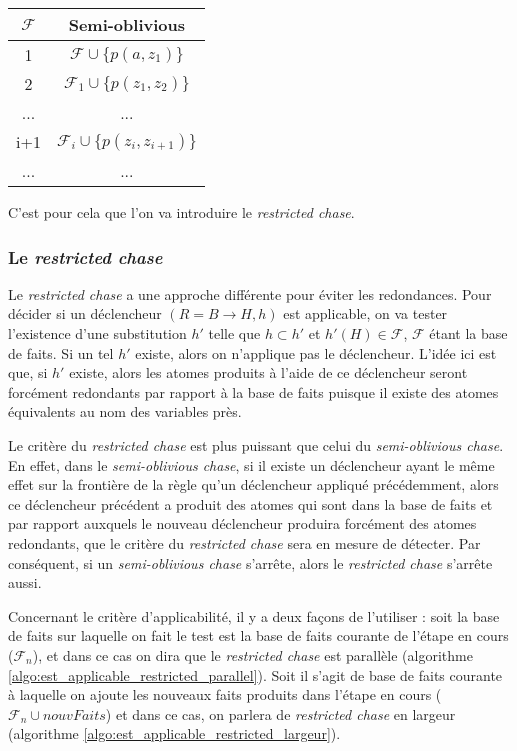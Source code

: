 \begin{center}
\begin{tabular}{|c|c|}
    \hline
    $\mathcal{F}$ & Semi-oblivious \\ 
    \hline
    1  & $\mathcal{F} \cup \{p(a, z_1)\} $ \\ 
    \hline
    2  &$\mathcal{F}_1 \cup \{p(z_1, z_2)\}$  \\
    \hline
    ...  & ...  \\
    \hline
    i+1 & $\mathcal{F}_i \cup \{p(z_{i}, z_{i+1})\} $   \\
     \hline
     ...  & ...  \\
     \hline
\end{tabular}
\end{center}
C'est pour cela que l'on va introduire le \textit{restricted chase}.

\subsubsection{Le \textit{restricted chase}}\label{sec:restricted_chase}

Le \textit{restricted chase} a une approche différente pour éviter les redondances. Pour décider si un déclencheur $(R = B \rightarrow H,h)$ est applicable, on va tester l'existence d'une substitution $h'$ telle que $h \subset h'$ et $h'(H) \in \mathcal{F}$, $\mathcal{F}$ étant la base de faits. Si un tel $h'$ existe, alors on n'applique pas le déclencheur. L'idée ici est que, si $h'$ existe, alors les atomes produits à l'aide de ce déclencheur seront forcément redondants par rapport à la base de faits puisque il existe des atomes équivalents au nom des variables près.
\par Le critère du \textit{restricted chase} est plus puissant que celui du \textit{semi-oblivious chase}. En effet, dans le \textit{semi-oblivious chase}, si il existe un déclencheur ayant le même effet sur la frontière de la règle qu'un déclencheur appliqué précédemment, alors ce déclencheur précédent a produit des atomes qui sont dans la base de faits et par rapport auxquels le nouveau déclencheur produira forcément des atomes redondants, que le critère du \textit{restricted chase} sera en mesure de détecter. Par conséquent, si un \textit{semi-oblivious chase} s'arrête, alors le \textit{restricted chase} s'arrête aussi.
\par Concernant le critère d'applicabilité, il y a deux façons de l'utiliser : soit la base de faits sur laquelle on fait le test est la base de faits courante de l'étape en cours ($\mathcal{F}_n$), et dans ce cas on dira que le \textit{restricted chase} est parallèle (algorithme \ref{algo:est_applicable_restricted_parallel}). Soit il s'agit de base de faits courante à laquelle on ajoute les nouveaux faits produits dans l'étape en cours ($\mathcal{F}_n \cup nouvFaits$) et dans ce cas, on parlera de \textit{restricted chase} en largeur (algorithme \ref{algo:est_applicable_restricted_largeur}).

